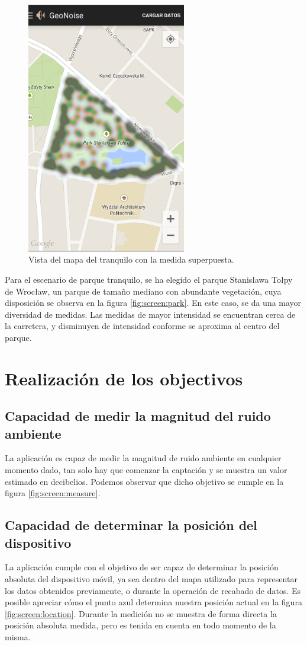 \begin{figure}[H]
\begin{minipage}{0.45\textwidth}
    \includegraphics[height=11cm]{graphs/parkmapped.png} \caption{Vista del mapa del tranquilo con la medida superpuesta.}\label{fig:screen:parkmapped}
\end{minipage}
\end{figure}
    Para el escenario de parque tranquilo, se ha elegido el parque Stanisława Tołpy de Wrocław, un parque de tamaño mediano con abundante vegetación, cuya disposición se observa en la figura \ref{fig:screen:park}. En este caso, se da una mayor diversidad de medidas. Las medidas de mayor intensidad se encuentran cerca de la carretera, y disminuyen de intensidad conforme se aproxima al centro del parque.


\section{Realización de los objectivos}

\subsection{Capacidad de medir la magnitud del ruido ambiente}
La aplicación es capaz de medir la magnitud de ruido ambiente en cualquier momento dado, tan solo hay que comenzar la captación y se muestra un valor estimado en decibelios. Podemos observar que dicho objetivo se cumple en la figura \ref{fig:screen:measure}.

\subsection{Capacidad de determinar la posición del dispositivo}
La aplicación cumple con el objetivo de ser capaz de determinar la posición absoluta del dispositivo móvil, ya sea dentro del mapa utilizado para representar los datos obtenidos previamente, o durante la operación de recabado de datos. Es posible apreciar cómo el punto azul determina nuestra posición actual en la figura \ref{fig:screen:location}. Durante la medición no se muestra de forma directa la posición absoluta medida, pero es tenida en cuenta en todo momento de la misma.


